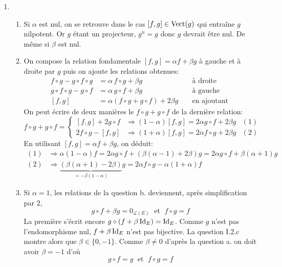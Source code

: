 \begin{enumerate}
  \item
\begin{enumerate}
  \item Si $\alpha$ est nul, on se retrouve dans le cas $[f,g]\in \operatorname{Vect}(g)$ qui entraîne $g$ nilpotent. Or $g$ étant un projecteur, $g^n=g$ donc $g$ devrait être nul. De même si $\beta$ est nul.
  
  \item On compose la relation fondamentale $[f,g]=\alpha f + \beta g$ à gauche et à droite par $g$ puis on ajoute les relations obtenues:
\begin{align*}
  f\circ g - g\circ f \circ g &= \alpha\, f\circ g + \beta g & &\text{ à droite } \\
  g\circ f\circ g - g\circ f &= \alpha\, g\circ f + \beta g & &\text{ à gauche } \\
  [f,g] &= \alpha \left(f\circ g + g\circ f \right) + 2\beta g & &\text{ en ajoutant }
\end{align*}
On peut écrire de deux manières le $f\circ g + g\circ f$ de la dernière relation:
\begin{displaymath}
f\circ g + g\circ f=
\left\lbrace 
\begin{aligned}
\left[ f,g\right]  + 2 g\circ f &\Rightarrow (1-\alpha)[f,g] = 2\alpha g\circ f + 2\beta g &(1)\\
2f\circ g - [f,g] &\Rightarrow (1+\alpha)[f,g] = 2\alpha f\circ g + 2\beta g &(2)
\end{aligned}
\right. 
\end{displaymath}
En utilisant $[f,g] = \alpha f + \beta g$, on déduit:
\begin{align*}
(1)& \Rightarrow \alpha(1-\alpha)f = 2\alpha g\circ f + \left(\beta(\alpha -1) + 2\beta \right)g = 2\alpha g\circ f + \beta(\alpha +1)g \\
(2)& \Rightarrow \underset{=-\beta(1-\alpha)}{\underbrace{\left(\beta(\alpha +1)-2\beta\right)}}g = 2\alpha f\circ g -\alpha(1+\alpha)f  
\end{align*}

  \item Si $\alpha =1$, les relations de la question b. deviennent, après simplification par $2$,
\begin{displaymath}
  g\circ f + \beta g = 0_{\mathcal{L}(E)}\; \text{ et } \; f\circ g = f
\end{displaymath}
La première s'écrit encore $g\circ(f+\beta\operatorname{Id}_E)=\operatorname{Id}_E$. Comme $g$ n'est pas l'endomorphisme nul, $f+\beta \operatorname{Id}_E$ n'est pas bijective. La question I.2.c montre alors que $\beta\in \{0,-1\}$. Comme $\beta\neq 0$ d'après la question a. on doit avoir $\beta = -1$ d'où
\begin{displaymath}
  g\circ f = g \; \text{ et } \; f\circ g = f
\end{displaymath}


\end{enumerate}
\end{enumerate}
